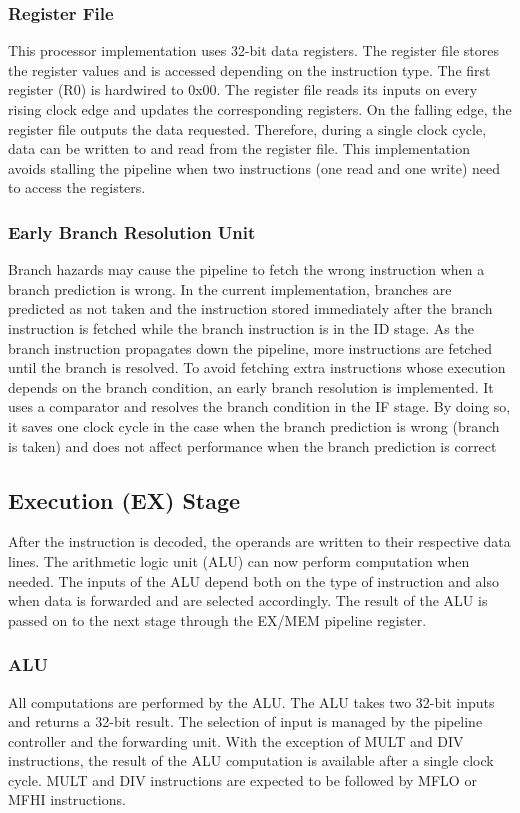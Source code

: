 \documentclass[conference]{IEEEtran}
\begin{document}
\subsubsection{Register File}
This processor implementation uses 32-bit data registers. The register file stores the register values and is accessed depending on the instruction type. The first register (R0) is hardwired to 0x00. The register file reads its inputs on every rising clock edge and updates the corresponding registers. On the falling edge, the register file outputs the data requested. Therefore, during a single clock cycle, data can be written to and read from the register file. This implementation avoids stalling the pipeline when two instructions (one read and one write) need to access the registers.

\subsubsection{Early Branch Resolution Unit}
Branch hazards may cause the pipeline to fetch the wrong instruction when a branch prediction is wrong. In the current implementation, branches are predicted as not taken and the instruction stored immediately after the branch instruction is fetched while the branch instruction is in the ID stage. As the branch instruction propagates down the pipeline, more instructions are fetched until the branch is resolved. To avoid fetching extra instructions whose execution depends on the branch condition, an early branch resolution is implemented. It uses a comparator and resolves the branch condition in the IF stage. By doing so, it saves one clock cycle in the case when the branch prediction is wrong (branch is taken) and does not affect performance when the branch prediction is correct

\subsection{Execution (EX) Stage}

After the instruction is decoded, the operands are written to their respective data lines. The arithmetic logic unit (ALU) can now perform computation when needed. The inputs of the ALU depend both on the type of instruction and also when data is forwarded and are selected accordingly. The result of the ALU is passed on to the next stage through the EX/MEM pipeline register.

\subsubsection{ALU}
All computations are performed by the ALU. The ALU takes two 32-bit inputs and returns a 32-bit result.  The selection of input is managed by the pipeline controller and the forwarding unit. With the exception of MULT and DIV instructions, the result of the ALU computation is available after a single clock cycle. MULT and DIV instructions are expected to be followed by MFLO or MFHI instructions. 
\end{document}
